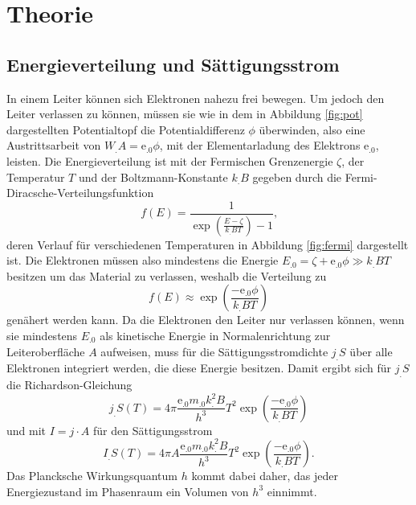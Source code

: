 \section{Theorie}
\label{sec:Theorie}

\subsection{Energieverteilung und Sättigungsstrom}

In einem Leiter können sich Elektronen nahezu frei bewegen. Um jedoch den Leiter verlassen zu können, müssen sie wie in dem in Abbildung \ref{fig:pot} dargestellten Potentialtopf die Potentialdifferenz $\phi$ überwinden, also eine Austrittsarbeit von $W_.A=\mathrm{e}_.0\phi$, mit der Elementarladung des Elektrons $\mathrm{e}_.0$, leisten. \newline
Die Energieverteilung ist mit der Fermischen Grenzenergie $\zeta$, der Temperatur $T$ und der Boltzmann-Konstante $k_.B$ gegeben durch die Fermi-Diracsche-Verteilungsfunktion
\[
f(E)= \frac{1}{\exp{\left(\frac{E-\zeta}{k_.BT}\right)}-1}\text{,}
\]
deren Verlauf für verschiedenen Temperaturen in Abbildung \ref{fig:fermi} dargestellt ist.
Die Elektronen müssen also mindestens die Energie $E_.0=\zeta + \mathrm{e}_.0\phi\gg k_.BT$ besitzen um das Material zu verlassen, weshalb die Verteilung zu 
\begin{equation}
f(E)\approx\exp{\left(\frac{-\mathrm{e}_.0\phi}{k_.BT}\right)}\label{eq:FDV}
\end{equation}
genähert werden kann. Da die Elektronen den Leiter nur verlassen können, wenn sie mindestens $E_.0$ als kinetische Energie in Normalenrichtung zur Leiteroberfläche $A$ aufweisen, muss für die Sättigungsstromdichte $j_.S$ über alle Elektronen integriert werden, die diese Energie besitzen. Damit ergibt sich für $j_.S$ die Richardson-Gleichung
\[
j_.S(T)=4\pi\frac{\mathrm{e}_.0m_.0k^2_.B}{h^3}T^2\exp{\left(\frac{-\mathrm{e}_.0\phi}{k_.BT}\right)}
\]
und mit $I=j\cdot A$ für den Sättigungsstrom 
\begin{equation}
I_.S(T) = 4\pi A\frac{\mathrm{e}_.0m_.0k^2_.B}{h^3}T^2\exp{\left(\frac{-\mathrm{e}_.0\phi}{k_.BT}\right)}\text{.}\label{eq:IS}
\end{equation}
Das Plancksche Wirkungsquantum $h$ kommt dabei daher, das jeder Energiezustand im Phasenraum ein Volumen von $h^3$ einnimmt.


